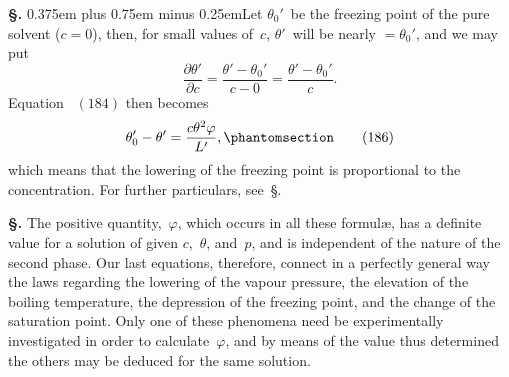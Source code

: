 \documentclass[12pt]{book}[2005/09/16]
\newcommand{\Chg}[2]{#2}
\newcommand{\Add}[1]{\Chg{}{#1}}
\newcommand{\Loosen}{\spaceskip 0.375em plus 0.75em minus 0.25em}
\newcommand{\Section}[1]{
  \medskip\par\textbf{§\;#1}
  \label{section:#1}
}
\newcommand{\SecRef}[2][§\;]{\hyperref[section:#2.]{{\upshape #1#2}}}
\newcommand{\Tag}[1]{%
  \phantomsection\label{eqn:#1}\tag*{\ensuremath{#1}}%
}
\newcommand{\Eq}[1]{%
  \hyperref[eqn:#1]{\ensuremath{#1}}%
}
\newcommand{\PageSep}[1]{\ignorespaces}
\newcommand{\dd}{\partial}
\begin{document}
\Section{228.} {\Loosen Let $\theta_{0}'$~be the freezing point of the pure solvent
($c = 0$), then, for small values of~$c$, $\theta'$~will be nearly $= \theta_{0}'$,
and we may put}
\[
\frac{\dd \theta'}{\dd c}
  = \frac{\theta' - \theta_{0}'}{c - 0}
  = \frac{\theta' - \theta_{0}'}{c}.
\]
Equation~\Eq{(184)} then becomes
\[
\theta_{0}' - \theta' = \frac{c\theta^{2} \varphi}{L'}\Add{,}
\Tag{(186)}
\]
which means that the lowering of the freezing point is
%
proportional to the concentration. For further particulars,
see~\SecRef{271}.

\Section{229.} The positive quantity,~$\varphi$, which occurs in all these
formulæ, has a definite value for a solution of given $c$,~$\theta$,
and~$p$, and is independent of the nature of the second phase.
Our last equations, therefore, connect in a perfectly general
way the laws regarding the lowering of the vapour pressure,
the elevation of the boiling temperature, the depression of the
freezing point, and the change of the saturation point. Only
one of these phenomena need be experimentally investigated
in order to calculate~$\varphi$, and by means of the value thus
determined the others may be deduced for the same solution.
\PageSep{203}
\end{document}
